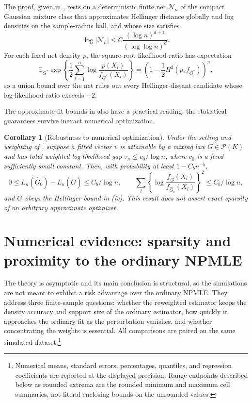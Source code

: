 \documentclass[11pt]{article}
\newtheorem{corollary}{Corollary}
\theoremstyle{definition}
\theoremstyle{remark}
\newcommand{\Pcal}{\mathcal P}
\newcommand{\Ncal}{\mathcal N}
\newcommand{\EE}{\mathbb E}
\newcommand{\abs}[1]{\lvert #1\rvert}
\newcommand{\Ghat}{\widehat G}
\newcommand{\Gtil}{\widetilde G}
\newcommand{\vtil}{\widetilde v}
\begin{document}
The proof, given in , rests on a deterministic finite
net $\Ncal_n$ of the compact Gaussian mixture class that approximates
Hellinger distance globally and log densities on the sample-radius ball, and
whose size satisfies
\begin{equation}\label{eq:net-entropy-summary}
 \log\abs{\Ncal_n}
 \le C\frac{(\log n)^{d+1}}{(\log\log n)^d}.
\end{equation}
For each fixed net density $p$, the square-root likelihood ratio has
expectation
\[
 \EE_{G^*}\exp\left\{\frac12\sum_{i=1}^n
          \log\frac{p(X_i)}{f_{G^*}(X_i)}\right\}
 =\left(1-\frac12H^2(p,f_{G^*})\right)^n,
\]
so a union bound over the net rules out every Hellinger-distant candidate
whose log-likelihood ratio exceeds $-2$.

The approximate-fit bounds in  also have a practical
reading: the statistical guarantees survive inexact numerical optimization.

\begin{corollary}[Robustness to numerical optimization]
\label{cor:approx}
Under the setting and weighting of , suppose a fitted vector
$\vtil$ is attainable by a mixing law $\Gtil\in\Pcal(K)$ and has total
weighted log-likelihood gap $\tau_n\le c_0/\log n$, where $c_0$ is a fixed
sufficiently small constant.  Then, with probability at least $1-C_bn^{-b}$,
\[
 0\le L_n(\Ghat_0)-L_n(\Gtil)\le C_b/\log n,
 \qquad
 \sum_i\left\{\log\frac{f_{\Gtil}(X_i)}
 {f_{\Ghat_0}(X_i)}\right\}^2\le C_b/\log n,
\]
and $\Gtil$ obeys the Hellinger bound in (iv).  This result
does not assert exact sparsity of an arbitrary approximate optimizer.
\end{corollary}

\section{Numerical evidence: sparsity and proximity to the ordinary NPMLE}
\label{sec:numerics}

The theory is asymptotic and its main conclusion is structural, so the
simulations are not meant to exhibit a risk advantage over the ordinary
NPMLE.  They address three finite-sample questions: whether the reweighted
estimator keeps the density accuracy and support size of the ordinary
estimator, how quickly it approaches the ordinary fit as the perturbation
vanishes, and whether concentrating the weights is essential.  All
comparisons are paired on the same simulated dataset.\footnote{Numerical
means, standard errors, percentages, quantiles, and regression coefficients
are reported at the displayed precision.  Range endpoints described below as
rounded extrema are the rounded minimum and maximum cell summaries, not
literal enclosing bounds on the unrounded values.}
\end{document}
